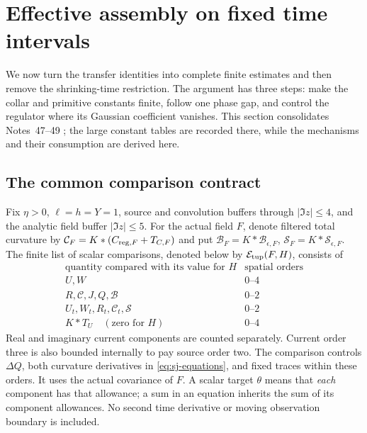 \section{Effective assembly on fixed time intervals}\label{sec:uniform-assembly}
We now turn the transfer identities into complete finite estimates and
then remove the shrinking-time restriction. The argument has three
steps: make the collar and primitive constants finite, follow one phase
gap, and control the regulator where its Gaussian coefficient vanishes.
This section consolidates Notes~47--49 \cite{n47,n48,n49}; the large
constant tables are recorded there, while the mechanisms and their
consumption are derived here.

\subsection{The common comparison contract}
Fix $\eta>0$, $\ell=h=Y=1$, source and convolution buffers through
$|\Im z|\le4$, and the analytic field buffer $|\Im z|\le5$.
For the actual field $F$, denote filtered total curvature by
$\mathcal C_F=K*(C_{{\rm reg},F}+T_{C,F})$ and put
$\mathcal B_F=K*\mathcal B_{\epsilon,F}$,
$\mathcal S_F=K*\mathcal S_{\epsilon,F}$. The finite list of scalar
comparisons, denoted below by $\mathcal E_{\rm tup}(F,H)$, consists of
\begin{equation}
\begin{array}{c|c}
\text{quantity compared with its value for }H&\text{spatial orders}\\ \hline
 U,W&0\text{--}4\\
 R,\mathcal C,J,Q,\mathcal B&0\text{--}2\\
 U_t,W_t,R_t,\mathcal C_t,\mathcal S&0\text{--}2\\
 K*T_U\quad(\text{zero for }H)&0\text{--}4
\end{array}
\label{eq:ua-contract}
\end{equation}
Real and imaginary current components are counted separately. Current
order three is also bounded internally to pay source order two.
The comparison controls $\Delta Q$, both curvature derivatives in
\eqref{eq:sj-equations}, and fixed traces within these orders. It uses
the actual covariance of $F$. A scalar target $\theta$ means that
\emph{each} component has that allowance; a sum in an equation inherits
the sum of its component allowances. No second time derivative or
moving observation boundary is included.

